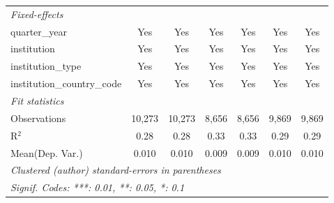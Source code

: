 \begin{tabular}{lcccccc}
   \midrule
   \emph{Fixed-effects}\\
   quarter\_year                      & Yes     & Yes        & Yes     & Yes       & Yes     & Yes\\  
   institution                        & Yes     & Yes        & Yes     & Yes       & Yes     & Yes\\  
   institution\_type                  & Yes     & Yes        & Yes     & Yes       & Yes     & Yes\\  
   institution\_country\_code         & Yes     & Yes        & Yes     & Yes       & Yes     & Yes\\  
   \midrule
   \emph{Fit statistics}\\
   Observations                       & 10,273  & 10,273     & 8,656   & 8,656     & 9,869   & 9,869\\  
   R$^2$                              & 0.28    & 0.28       & 0.33    & 0.33      & 0.29    & 0.29\\  
Mean(Dep. Var.) & 0.010 & 0.010 & 0.009 & 0.009 & 0.010 & 0.010 \\
   \midrule \midrule
   \multicolumn{7}{l}{\emph{Clustered (author) standard-errors in parentheses}}\\
   \multicolumn{7}{l}{\emph{Signif. Codes: ***: 0.01, **: 0.05, *: 0.1}}\\
\end{tabular}
\par\endgroup
